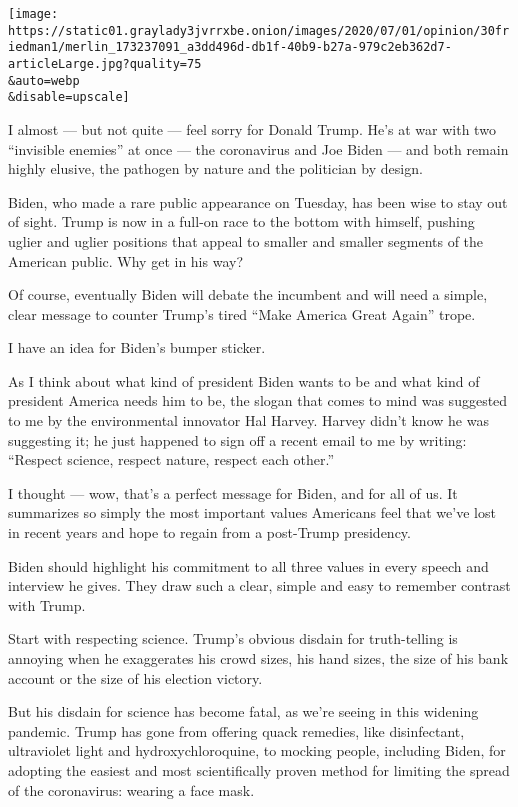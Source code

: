 \texttt{[image: https://static01.graylady3jvrrxbe.onion/images/2020/07/01/opinion/30friedman1/merlin\_173237091\_a3dd496d-db1f-40b9-b27a-979c2eb362d7-articleLarge.jpg?quality=75\\\&auto=webp\\\&disable=upscale]}

I almost --- but not quite --- feel sorry for Donald Trump. He's at war
with two ``invisible enemies'' at once --- the coronavirus and Joe Biden
--- and both remain highly elusive, the pathogen by nature and the
politician by design.

Biden, who made a rare public appearance on Tuesday, has been wise to
stay out of sight. Trump is now in a full-on race to the bottom with
himself, pushing uglier and uglier positions that appeal to smaller and
smaller segments of the American public. Why get in his way?

Of course, eventually Biden will debate the incumbent and will need a
simple, clear message to counter Trump's tired ``Make America Great
Again'' trope.

I have an idea for Biden's bumper sticker.

As I think about what kind of president Biden wants to be and what kind
of president America needs him to be, the slogan that comes to mind was
suggested to me by the environmental innovator Hal Harvey. Harvey didn't
know he was suggesting it; he just happened to sign off a recent email
to me by writing: ``Respect science, respect nature, respect each
other.''

I thought --- wow, that's a perfect message for Biden, and for all of
us. It summarizes so simply the most important values Americans feel
that we've lost in recent years and hope to regain from a post-Trump
presidency.

Biden should highlight his commitment to all three values in every
speech and interview he gives. They draw such a clear, simple and easy
to remember contrast with Trump.

Start with respecting science. Trump's obvious disdain for truth-telling
is annoying when he exaggerates his crowd sizes, his hand sizes, the
size of his bank account or the size of his election victory.

But his disdain for science has become fatal, as we're seeing in this
widening pandemic. Trump has gone from offering quack remedies, like
disinfectant, ultraviolet light and hydroxychloroquine, to mocking
people, including Biden, for adopting the easiest and most
scientifically proven method for limiting the spread of the coronavirus:
wearing a face mask.

